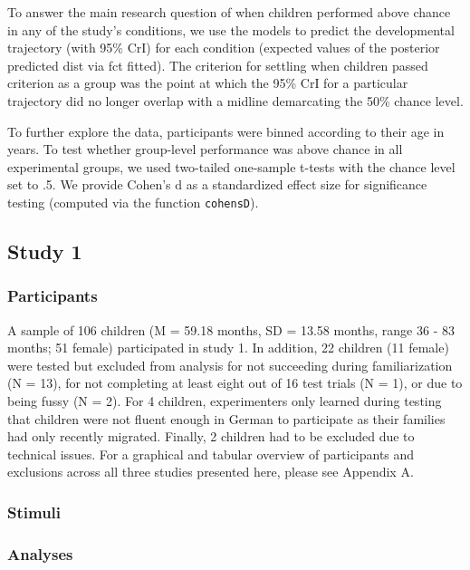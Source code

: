 \documentclass[
  man]{apa6}
\begin{document}
To answer the main research question of when children performed above chance in any of the study's conditions, we use the models to predict the developmental trajectory (with 95\% CrI) for each condition (expected values of the posterior predicted dist via fct fitted). The criterion for settling when children passed criterion as a group was the point at which the 95\% CrI for a particular trajectory did no longer overlap with a midline demarcating the 50\% chance level.

To further explore the data, participants were binned according to their age in years. To test whether group-level performance was above chance in all experimental groups, we used two-tailed one-sample t-tests with the chance level set to .5. We provide Cohen's d as a standardized effect size for significance testing (computed via the function \texttt{cohensD}).

\subsection{Study 1}\label{study-1}

\subsubsection{Participants}\label{participants}

A sample of 106 children (M = 59.18 months, SD = 13.58 months, range 36 - 83 months; 51 female) participated in study 1. In addition, 22 children (11 female) were tested but excluded from analysis for not succeeding during familiarization (N = 13), for not completing at least eight out of 16 test trials (N = 1), or due to being fussy (N = 2). For 4 children, experimenters only learned during testing that children were not fluent enough in German to participate as their families had only recently migrated. Finally, 2 children had to be excluded due to technical issues. For a graphical and tabular overview of participants and exclusions across all three studies presented here, please see Appendix A.

\subsubsection{Stimuli}\label{stimuli}

\subsubsection{Analyses}\label{analyses}
\end{document}
